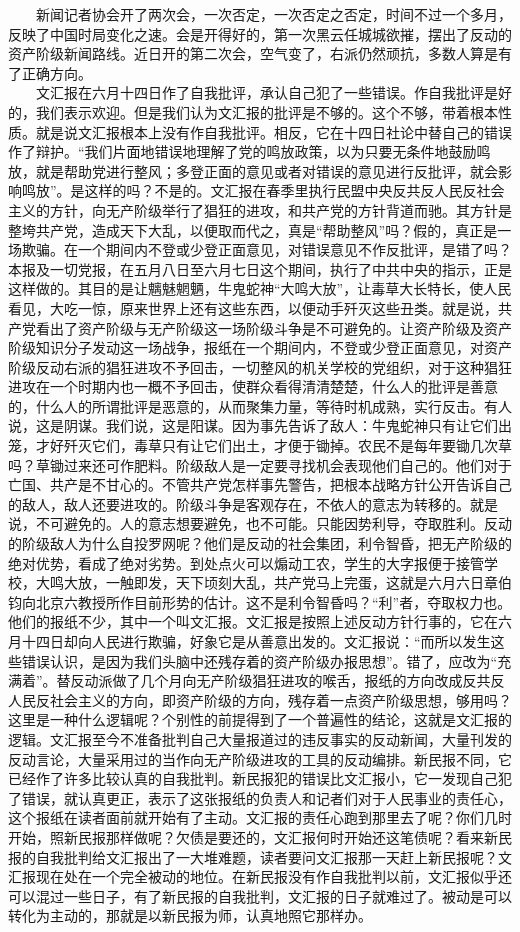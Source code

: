 \documentclass[cn,11pt,chinese]{elegantbook}
\begin{document}
　　新闻记者协会开了两次会，一次否定，一次否定之否定，时间不过一个多月，反映了中国时局变化之速。会是开得好的，第一次黑云任城城欲摧，摆出了反动的资产阶级新闻路线。近日开的第二次会，空气变了，右派仍然顽抗，多数人算是有了正确方向。\\
　　文汇报在六月十四日作了自我批评，承认自己犯了一些错误。作自我批评是好的，我们表示欢迎。但是我们认为文汇报的批评是不够的。这个不够，带着根本性质。就是说文汇报根本上没有作自我批评。相反，它在十四日社论中替自己的错误作了辩护。“我们片面地错误地理解了党的鸣放政策，以为只要无条件地鼓励鸣放，就是帮助党进行整风；多登正面的意见或者对错误的意见进行反批评，就会影响鸣放”。是这样的吗？不是的。文汇报在春季里执行民盟中央反共反人民反社会主义的方针，向无产阶级举行了猖狂的进攻，和共产党的方针背道而驰。其方针是整垮共产党，造成天下大乱，以便取而代之，真是“帮助整风”吗？假的，真正是一场欺骗。在一个期间内不登或少登正面意见，对错误意见不作反批评，是错了吗？本报及一切党报，在五月八日至六月七日这个期间，执行了中共中央的指示，正是这样做的。其目的是让魑魅魍魉，牛鬼蛇神“大鸣大放”，让毒草大长特长，使人民看见，大吃一惊，原来世界上还有这些东西，以便动手歼灭这些丑类。就是说，共产党看出了资产阶级与无产阶级这一场阶级斗争是不可避免的。让资产阶级及资产阶级知识分子发动这一场战争，报纸在一个期间内，不登或少登正面意见，对资产阶级反动右派的猖狂进攻不予回击，一切整风的机关学校的党组织，对于这种猖狂进攻在一个时期内也一概不予回击，使群众看得清清楚楚，什么人的批评是善意的，什么人的所谓批评是恶意的，从而聚集力量，等待时机成熟，实行反击。有人说，这是阴谋。我们说，这是阳谋。因为事先告诉了敌人：牛鬼蛇神只有让它们出笼，才好歼灭它们，毒草只有让它们出土，才便于锄掉。农民不是每年要锄几次草吗？草锄过来还可作肥料。阶级敌人是一定要寻找机会表现他们自己的。他们对于亡国、共产是不甘心的。不管共产党怎样事先警告，把根本战略方针公开告诉自己的敌人，敌人还要进攻的。阶级斗争是客观存在，不依人的意志为转移的。就是说，不可避免的。人的意志想要避免，也不可能。只能因势利导，夺取胜利。反动的阶级敌人为什么自投罗网呢？他们是反动的社会集团，利令智昏，把无产阶级的绝对优势，看成了绝对劣势。到处点火可以煽动工农，学生的大字报便于接管学校，大鸣大放，一触即发，天下顷刻大乱，共产党马上完蛋，这就是六月六日章伯钧向北京六教授所作目前形势的估计。这不是利令智昏吗？“利”者，夺取权力也。他们的报纸不少，其中一个叫文汇报。文汇报是按照上述反动方针行事的，它在六月十四日却向人民进行欺骗，好象它是从善意出发的。文汇报说：“而所以发生这些错误认识，是因为我们头脑中还残存着的资产阶级办报思想”。错了，应改为“充满着”。替反动派做了几个月向无产阶级猖狂进攻的喉舌，报纸的方向改成反共反人民反社会主义的方向，即资产阶级的方向，残存着一点资产阶级思想，够用吗？这里是一种什么逻辑呢？个别性的前提得到了一个普遍性的结论，这就是文汇报的逻辑。文汇报至今不准备批判自己大量报道过的违反事实的反动新闻，大量刊发的反动言论，大量采用过的当作向无产阶级进攻的工具的反动编排。新民报不同，它已经作了许多比较认真的自我批判。新民报犯的错误比文汇报小，它一发现自己犯了错误，就认真更正，表示了这张报纸的负责人和记者们对于人民事业的责任心，这个报纸在读者面前就开始有了主动。文汇报的责任心跑到那里去了呢？你们几时开始，照新民报那样做呢？欠债是要还的，文汇报何时开始还这笔债呢？看来新民报的自我批判给文汇报出了一大堆难题，读者要问文汇报那一天赶上新民报呢？文汇报现在处在一个完全被动的地位。在新民报没有作自我批判以前，文汇报似乎还可以混过一些日子，有了新民报的自我批判，文汇报的日子就难过了。被动是可以转化为主动的，那就是以新民报为师，认真地照它那样办。\\
\end{document}
